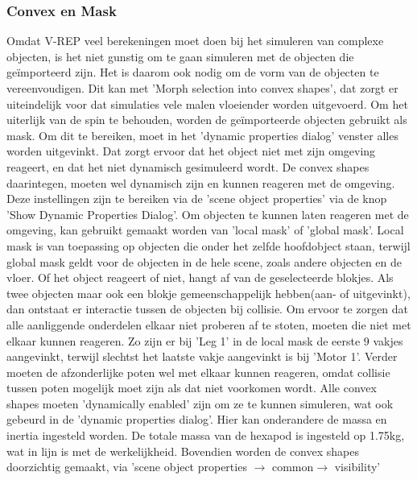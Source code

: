 \documentclass[10pt,a4paper]{article}
\begin{document}
\subsubsection{Convex en Mask}
Omdat V-REP veel berekeningen moet doen bij het simuleren van complexe objecten, is het niet gunstig om te gaan simuleren met de objecten die ge\"importeerd zijn. Het is daarom ook nodig om de vorm van de objecten te vereenvoudigen. Dit kan met 'Morph selection into convex shapes', dat zorgt er uiteindelijk voor dat simulaties vele malen vloeiender worden uitgevoerd. 
Om het uiterlijk van de spin te behouden, worden de ge\"importeerde objecten gebruikt als mask. Om dit te bereiken, moet in het 'dynamic properties dialog' venster alles worden uitgevinkt. Dat zorgt ervoor dat het object niet met zijn omgeving reageert, en dat het niet dynamisch gesimuleerd wordt.
De convex shapes daarintegen, moeten wel dynamisch zijn en kunnen reageren met de omgeving. Deze instellingen zijn te bereiken via de 'scene object properties' via de knop 'Show Dynamic Properties Dialog'. Om objecten te kunnen laten reageren met de omgeving, kan gebruikt gemaakt worden van 'local mask' of 'global mask'. Local mask is van toepassing op objecten die onder het zelfde hoofdobject staan, terwijl global mask geldt voor de objecten in de hele scene, zoals andere objecten en de vloer. Of het object reageert of niet, hangt af van de geselecteerde blokjes. %
Als twee objecten maar ook een blokje gemeenschappelijk hebben(aan- of uitgevinkt), dan ontstaat er interactie tussen de objecten bij collisie. Om ervoor te zorgen dat alle aanliggende onderdelen elkaar niet proberen af te stoten, moeten die niet met elkaar kunnen reageren. Zo zijn er bij 'Leg 1' in de local mask de eerste 9 vakjes aangevinkt, terwijl slechtst het laatste vakje aangevinkt is bij 'Motor 1'.
Verder moeten de afzonderlijke poten wel met elkaar kunnen reageren, omdat collisie tussen poten mogelijk moet zijn als dat niet voorkomen wordt. 
Alle convex shapes moeten 'dynamically enabled' zijn om ze te kunnen simuleren, wat ook gebeurd in de 'dynamic properties dialog'. Hier kan onderandere de massa en inertia ingesteld worden. De totale massa van de hexapod is ingesteld op 1.75kg, wat in lijn is met de werkelijkheid.
Bovendien worden de convex shapes doorzichtig gemaakt, via 
'scene object properties $\rightarrow$ common$\rightarrow$ visibility'
\end{document}

